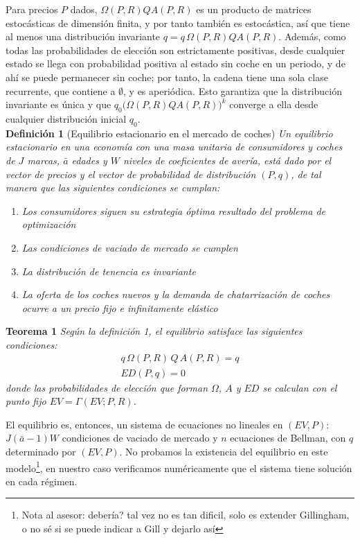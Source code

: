 \documentclass{article}
\begin{document}
Para precios $P$ dados, $\Omega(P,R)QA(P,R)$ es un producto de matrices estocásticas de dimensión finita, y por tanto también es estocástica, así que tiene al menos una distribución invariante $q=q\,\Omega(P,R)QA(P,R)$. Además, como todas las probabilidades de elección son estrictamente positivas, desde cualquier estado se llega con probabilidad positiva al estado sin coche en un periodo, y de ahí se puede permanecer sin coche; por tanto, la cadena tiene una sola clase recurrente, que contiene a $\emptyset$, y es aperiódica. Esto garantiza que la distribución invariante es única y que $q_0\big(\Omega(P,R)QA(P,R)\big)^k$ converge a ella desde cualquier distribución inicial $q_0$.\\


\textbf{Definición 1} (Equilibrio estacionario en el mercado de coches) \textit{Un equilibrio estacionario en una economía con una masa unitaria de consumidores y coches de $J$ marcas, $\bar{a}$ edades y $W$ niveles de coeficientes de avería, está dado por el vector de precios y el vector de probabilidad de distribución $(P,q)$, de tal manera que las siguientes condiciones se cumplan:}
\begin{enumerate}
    \item \textit{Los consumidores siguen su estrategia óptima resultado del problema de optimización}
    \item \textit{Las condiciones de vaciado de mercado se cumplen}
    \item \textit{La distribución de tenencia es invariante}
    \item \textit{La oferta de los coches nuevos y la demanda de chatarrización de coches ocurre a un precio fijo e infinitamente elástico}
\end{enumerate}

\textbf{Teorema 1} \textit{Según la definición 1, el equilibrio satisface las siguientes condiciones:}
$$\begin{aligned}
    q\,\Omega(P,R)\,Q\,A(P,R)=q\\
    ED(P,q)=0
\end{aligned}$$
\textit{donde las probabilidades de elección que forman $\Omega$, $A$ y $ED$ se calculan con el punto fijo $EV=\Gamma(EV;P,R)$.}

El equilibrio es, entonces, un sistema de ecuaciones no lineales en $(EV,P)$: $J(\bar{a}-1)W$ condiciones de vaciado de mercado y $n$ ecuaciones de Bellman, con $q$ determinado por $(EV,P)$. No probamos la existencia del equilibrio en este modelo\footnote{Nota al asesor: debería? tal vez no es tan dificil, solo es extender Gillingham, o no sé si se puede indicar a Gill y dejarlo así}, en nuestro caso verificamos numéricamente que el sistema tiene solución en cada régimen.
\end{document}
